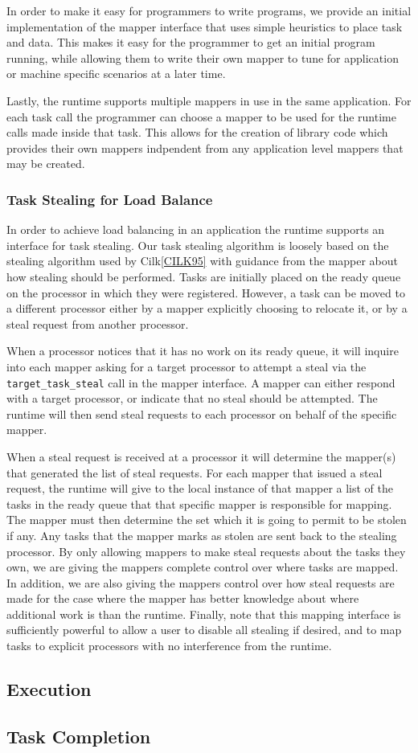 In order to make it easy for programmers to write programs, we provide an initial implementation 
of the mapper interface that uses simple heuristics to place task and data.  This makes it easy
for the programmer to get an initial program running, while allowing them to write their own
mapper to tune for application or machine specific scenarios at a later time.

Lastly, the runtime supports multiple mappers in use in the same application.  For each task 
call the programmer can choose a mapper to be used for the runtime calls made inside that
task.  This allows for the creation of library code which provides their own mappers indpendent
from any application level mappers that may be created.

\subsubsection{Task Stealing for Load Balance}
\label{subsec:steal}
In order to achieve load balancing in an application the runtime supports an interface
for task stealing.  Our task stealing algorithm is loosely based on the stealing algorithm
used by Cilk\ref{CILK95} with guidance from the mapper about how stealing should be
performed.  Tasks are initially placed on the ready queue on the processor in which they
were registered.  However, a task can be moved to a different processor either by a mapper
explicitly choosing to relocate it, or by a steal request from another processor.

When a processor notices that it has no work on its ready queue, it will inquire into each
mapper asking for a target processor to attempt a steal via the {\tt target\_task\_steal}
call in the mapper interface.  A mapper can either respond with
a target processor, or indicate that no steal should be attempted.  The runtime will then
send steal requests to each processor on behalf of the specific mapper.  

When a steal request is received at a processor it will determine the mapper(s) that generated
the list of steal requests.  For each mapper that issued a steal request, the runtime will
give to the local instance of that mapper a list of the tasks in the ready queue that that
specific mapper is responsible for mapping.  The mapper must then determine the set which
it is going to permit to be stolen if any.  Any tasks that the mapper marks as stolen are
sent back to the stealing processor.  By only allowing mappers to make steal requests about
the tasks they own, we are giving the mappers complete control over where tasks are mapped.
In addition, we are also giving the mappers control over how steal requests are made for
the case where the mapper has better knowledge about where additional work is than the 
runtime.  Finally, note that this mapping interface is sufficiently powerful to allow a user to
disable all stealing if desired, and to map tasks to explicit processors with no interference
from the runtime.

\subsection{Execution}

\subsection{Task Completion}


